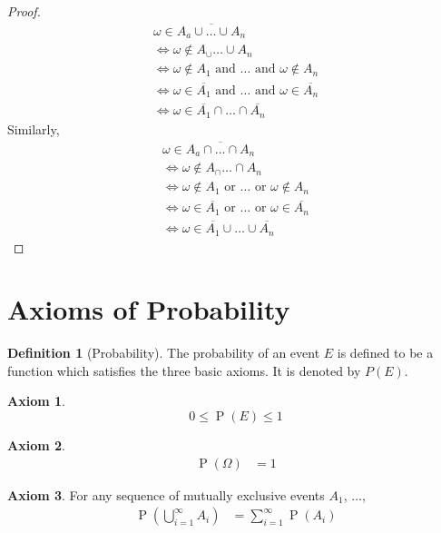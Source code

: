 \documentclass[titlepage, fleqn, a4paper, 12pt, twoside]{article}
\theoremstyle{definition}
\newtheorem{definition}{Definition}
\theoremstyle{theorem}
\newtheorem{axiom}{Axiom}
\DeclareMathOperator{\prob}{\mathrm{P}}
\begin{document}
\begin{proof}
	\begin{gather*}
		\omega \in \overline{A_a \cup \dots \cup A_n}\\
		\iff \omega \notin A_ \cup \dots \cup A_n\\
		\iff \omega \notin A_1 \text{ and } \dots \text{ and } \omega \notin A_n\\
		\iff \omega \in \overline{A_1} \text{ and } \dots \text{ and } \omega \in \overline{A_n}\\
		\iff \omega \in \overline{A_1} \cap \dots \cap \overline{A_n}
	\end{gather*}
	Similarly,
	\begin{gather*}
		\omega \in \overline{A_a \cap \dots \cap A_n}\\
		\iff \omega \notin A_ \cap \dots \cap A_n\\
		\iff \omega \notin A_1 \text{ or } \dots \text{ or } \omega \notin A_n\\
		\iff \omega \in \overline{A_1} \text{ or } \dots \text{ or } \omega \in \overline{A_n}\\
		\iff \omega \in \overline{A_1} \cup \dots \cup \overline{A_n}
	\end{gather*}
\end{proof}

\section{Axioms of Probability}

\begin{definition}[Probability]
	The probability of an event $E$ is defined to be a function which satisfies the three basic axioms.
	It is denoted by $P(E)$.
	\begin{axiom}
		\begin{equation*}
			0 \le \prob(E) \le 1
		\end{equation*}
	\end{axiom}

	\begin{axiom}
		\begin{align*}
			\prob(\Omega) & = 1
		\end{align*}
	\end{axiom}

	\begin{axiom}
		For any sequence of mutually exclusive events $A_1$, $\dots$,
		\begin{align*}
			\prob\left( \bigcup\limits_{i = 1}^{\infty} A_i \right) & = \sum\limits_{i = 1}^{\infty} \prob(A_i)
		\end{align*}
	\end{axiom}
\end{definition}
\end{document}
